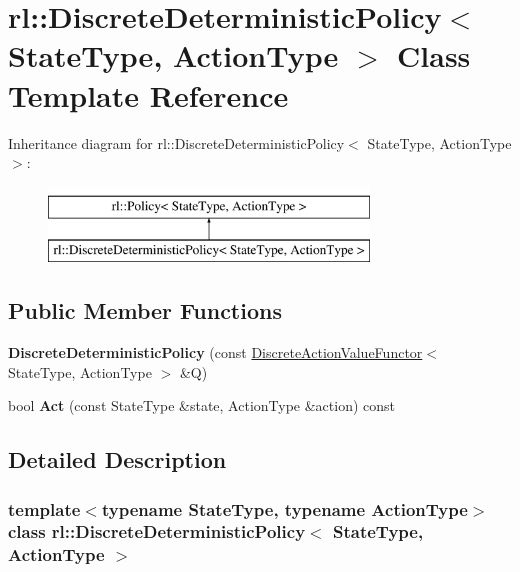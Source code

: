 \hypertarget{classrl_1_1_discrete_deterministic_policy}{}\section{rl\+:\+:Discrete\+Deterministic\+Policy$<$ State\+Type, Action\+Type $>$ Class Template Reference}
\label{classrl_1_1_discrete_deterministic_policy}
Inheritance diagram for rl\+:\+:Discrete\+Deterministic\+Policy$<$ State\+Type, Action\+Type $>$\+:\begin{figure}[H]
\begin{center}
\leavevmode
\includegraphics[height=2.000000cm]{classrl_1_1_discrete_deterministic_policy}
\end{center}
\end{figure}
\subsection*{Public Member Functions}
\begin{DoxyCompactItemize}
\item 
\hypertarget{classrl_1_1_discrete_deterministic_policy_a918a33ec7b0fc3acceacd945cf675949}{}\label{classrl_1_1_discrete_deterministic_policy_a918a33ec7b0fc3acceacd945cf675949} 
{\bfseries Discrete\+Deterministic\+Policy} (const \hyperlink{classrl_1_1_discrete_action_value_functor}{Discrete\+Action\+Value\+Functor}$<$ State\+Type, Action\+Type $>$ \&Q)
\item 
\hypertarget{classrl_1_1_discrete_deterministic_policy_aa464571566c0a6f97bb7e415fb78a491}{}\label{classrl_1_1_discrete_deterministic_policy_aa464571566c0a6f97bb7e415fb78a491} 
bool {\bfseries Act} (const State\+Type \&state, Action\+Type \&action) const
\end{DoxyCompactItemize}


\subsection{Detailed Description}
\subsubsection*{template$<$typename State\+Type, typename Action\+Type$>$\newline
class rl\+::\+Discrete\+Deterministic\+Policy$<$ State\+Type, Action\+Type $>$}




